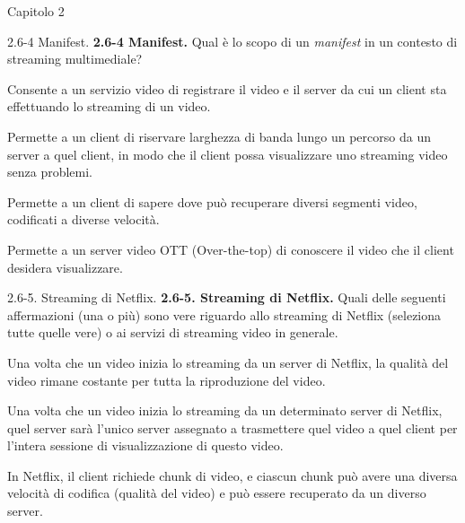 \documentclass[a4paper]{article}
\begin{document}
\begin{quiz}{Capitolo 2}
\begin{multi}[points=1,shuffle]{2.6-4 Manifest.}
\textbf{2.6-4 Manifest.}
Qual è lo scopo di un \emph{manifest} in un contesto di streaming multimediale?
\item Consente a un servizio video di registrare il video e il server da cui un client sta effettuando lo streaming di un video.
\item Permette a un client di riservare larghezza di banda lungo un percorso da un server a quel client, in modo che il client possa visualizzare uno streaming video senza problemi.
\item* Permette a un client di sapere dove può recuperare diversi segmenti video, codificati a diverse velocità.
\item Permette a un server video OTT (Over-the-top) di conoscere il video che il client desidera visualizzare.
\end{multi}

\begin{multi}[points=1,shuffle,multiple]{2.6-5. Streaming di Netflix.}
\textbf{2.6-5. Streaming di Netflix.}
Quali delle seguenti affermazioni (una o più) sono vere riguardo allo streaming di Netflix (seleziona tutte quelle vere) o ai servizi di streaming video in generale.
\item Una volta che un video inizia lo streaming da un server di Netflix, la qualità del video rimane costante per tutta la riproduzione del video.
\item Una volta che un video inizia lo streaming da un determinato server di Netflix, quel server sarà l'unico server assegnato a trasmettere quel video a quel client per l'intera sessione di visualizzazione di questo video.
\item* In Netflix, il client richiede chunk di video, e ciascun chunk può avere una diversa velocità di codifica (qualità del video) e può essere recuperato da un diverso server.
\end{multi}



\end{quiz}
\end{document}
